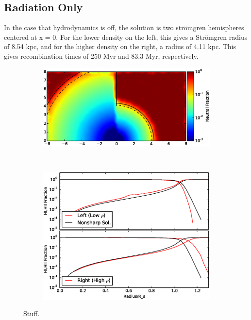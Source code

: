 \subsection{Radiation Only}
\label{sec:gaswallradonly}

In the case that hydrodynamics is off, the solution is two str\"omgren hemispheres centered at x = 0. For the lower density on the left, this gives a Str\"omgren radius of 8.54  kpc, and for the higher density on the right, a radius of 4.11 kpc. This gives recombination times of 250 Myr and 83.3 Myr, respectively.

\begin{figure}
		\centering
        \begin{subfigure}[b]{\textwidth}
                \includegraphics[width=\textwidth]{graphics/gasWall01000slice.eps}
                \caption{}
                \label{fig:gaswallslice}
        \end{subfigure}
        \\
        \begin{subfigure}[b]{\textwidth}
                \includegraphics[width=\textwidth]{graphics/gasWall01000HI.eps}
                \caption{}
                \label{fig:gaswallHI}
        \end{subfigure}
	\caption[Blister region without hydrodynamics]{Stuff.}
	\label{fig:gaswall}
\end{figure}

